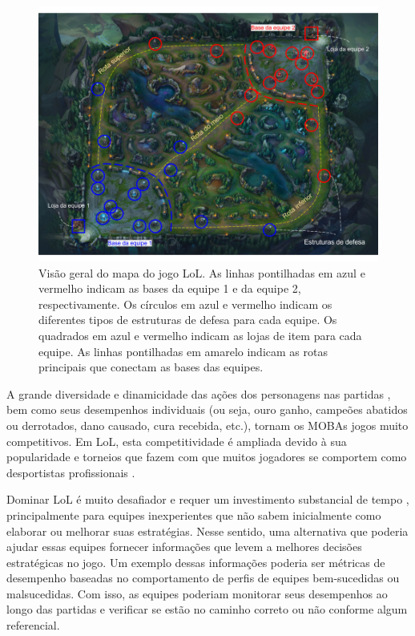 \begin{figure}
  \centering
  \includegraphics[width=1.0\textwidth]{map}%
  \caption{Visão geral do mapa do jogo LoL. As linhas pontilhadas em azul e vermelho indicam as bases da equipe 1 e da equipe 2, respectivamente.  Os círculos em azul e vermelho indicam os diferentes tipos de estruturas de defesa para cada equipe. Os quadrados em azul e vermelho indicam as lojas de item para cada equipe. As linhas pontilhadas em amarelo indicam as rotas principais que conectam as bases das equipes.}
  \label{fig:map}
\end{figure}

A grande diversidade e dinamicidade das ações dos personagens nas partidas \cite{drachen2014skill}, bem como seus desempenhos individuais (ou seja, ouro ganho, campeões abatidos ou derrotados, dano causado, cura recebida, etc.), tornam os MOBAs jogos muito competitivos. Em LoL, esta competitividade é ampliada devido à sua popularidade e torneios que fazem com que muitos jogadores se comportem como desportistas profissionais \cite{rioult2014mining}.

Dominar LoL é muito desafiador e requer um investimento substancial de tempo \cite{drachen2014skill}, principalmente para equipes inexperientes que não sabem inicialmente como elaborar ou melhorar suas estratégias. Nesse sentido, uma alternativa que poderia ajudar essas equipes  fornecer informações que levem a melhores decisões estratégicas no jogo. Um exemplo dessas informações poderia ser métricas de desempenho baseadas no comportamento de perfis de equipes bem-sucedidas ou malsucedidas. Com isso, as equipes poderiam monitorar seus desempenhos ao longo das partidas e verificar se estão no caminho correto ou não conforme algum referencial. 

